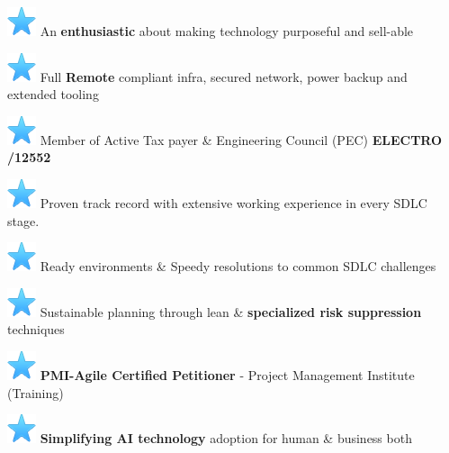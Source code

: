 \documentclass[]{cv-class}
\begin{document}
        \item {\includegraphics[scale=0.30]{img/star.png}} An \textbf{enthusiastic} about making technology purposeful and sell-able
           \item {\includegraphics[scale=0.30]{img/star.png}} Full \textbf{Remote} compliant infra, secured network, power backup and extended tooling
        \item {\includegraphics[scale=0.30]{img/star.png}}  Member of Active Tax payer \& Engineering Council (PEC) \textbf{ELECTRO /12552}
        \item {\includegraphics[scale=0.30]{img/star.png}} Proven track record with extensive working experience in every SDLC stage.
             \item {\includegraphics[scale=0.30]{img/star.png}} Ready environments \& Speedy resolutions to common SDLC challenges
        \item {\includegraphics[scale=0.30]{img/star.png}} Sustainable planning through lean \& \textbf{specialized risk suppression} techniques
        \item {\includegraphics[scale=0.30]{img/star.png}} {\textbf{ PMI-Agile Certified Petitioner} - Project Management Institute (Training)}
        \item {\includegraphics[scale=0.30]{img/star.png}} \textbf{Simplifying AI technology} adoption for human \& business both
  
\end{document}
